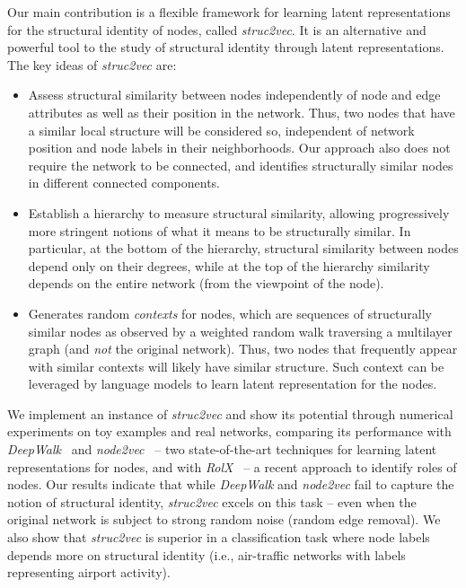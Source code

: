 \documentclass[sigconf]{acmart}
\begin{document}
Our main contribution is a flexible framework for learning latent representations for the structural identity of nodes, called \textit{struc2vec}. It is an alternative and powerful tool to the study of structural identity through latent representations. The key ideas of \textit{struc2vec} are:
\begin{itemize}
\item
Assess structural similarity between nodes independently of node and edge attributes as well as their position in the network. Thus, two nodes that have a similar local structure will be considered so, independent of network position and node labels in their neighborhoods. Our approach also does not require the network to be connected, and identifies structurally similar nodes in different connected components. 

\item
Establish a hierarchy to measure structural similarity, allowing progressively more stringent notions of what it means to be structurally similar. In particular, at the bottom of the hierarchy, structural similarity between nodes depend only on their degrees, while at the top of the hierarchy similarity depends on the entire network (from the viewpoint of the node). 

\item
Generates random {\em contexts} for nodes, which are sequences of structurally similar nodes as observed by a weighted random walk traversing a multilayer graph (and {\em not} the original network). Thus, two nodes that frequently appear with similar contexts will likely have similar structure. Such context can be leveraged by language models to learn latent representation for the nodes. 
\end{itemize}
We implement an instance of \textit{struc2vec} and show its potential through numerical experiments on toy examples and real networks, comparing its performance with \textit{DeepWalk}~\cite{Perozzi2014} and \textit{node2vec}~\cite{node2vec-kdd2016} -- two state-of-the-art techniques for learning latent representations for nodes, and with \textit{RolX}~\cite{henderson2012rolx} -- a recent approach to identify roles of nodes. Our results indicate that while \textit{DeepWalk} and \textit{node2vec} fail to capture the notion of structural identity,  \textit{struc2vec} excels on this task -- even when the original network is subject to strong random noise (random edge removal). We also show that \textit{struc2vec} is superior in a classification task where node labels depends more on structural identity (i.e., air-traffic networks with labels representing airport activity).
\end{document}
